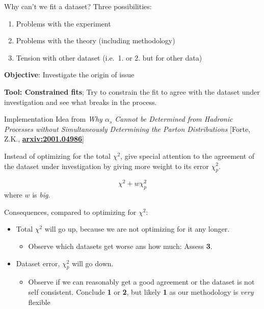 \author[Zahari Kassabov]{}

\begin{frame}{Why can't we fit a dataset?}
\protect\hypertarget{why-cant-we-fit-a-dataset}{}
Three possibilities:

\begin{enumerate}
\tightlist
\item
  Problems with the experiment
\item
  Problems with the theory (including methodology)
\item
  Tension with other dataset (i.e.~1. or 2. but for other data)
\end{enumerate}

\textbf{Objective}: Investigate the origin of issue

\textbf{Tool: Constrained fits}; Try to constrain the fit to agree with
the dataset under investigation and see what breaks in the process.
\end{frame}

\begin{frame}{Implementation}
\protect\hypertarget{implementation}{}
Idea from \emph{Why \(\alpha_s\) Cannot be Determined from Hadronic
Processes without Simultaneously Determining the Parton Distributions}
{[}Forte, Z.K.,
\href{https://arxiv.org/abs/2001.04986}{\textbf{arxiv:2001.04986}}{]}

Instead of optimizing for the total \(\chi^2\), give special attention
to the agreement of the dataset under investigation by giving more
weight to its error \(\chi^2_p\).

\[
\chi^2 + w \chi^2_p
\] where \(w\) is \emph{big}.

Consequences, compared to optimizing for \(\chi^2\):

\begin{itemize}
\tightlist
\item
  Total \(\chi^2\) will go up, because we are not optimizing for it any
  longer.

  \begin{itemize}
  \tightlist
  \item
    Observe which datasets get worse ans how much: Assess \textbf{3}.
  \end{itemize}
\item
  Dataset error, \(\chi^2_p\) will go down.

  \begin{itemize}
  \tightlist
  \item
    Observe if we can reasonably get a good agreement or the dataset is
    not self consistent. Conclude \textbf{1} or \textbf{2}, but likely
    \textbf{1} as our methodology is \emph{very} flexible
  \end{itemize}
\end{itemize}
\end{frame}

